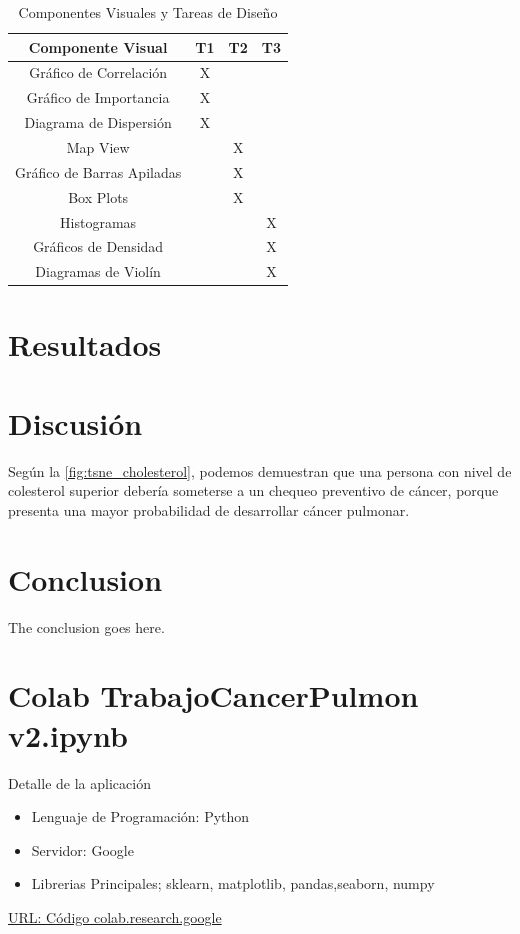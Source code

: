 \documentclass[10pt,journal,compsoc]{IEEEtran}
\begin{document}
\begin{table}[h!]
\centering
\caption{Componentes Visuales y Tareas de Diseño}
\begin{tabular}{|c|c|c|c|}
\hline
\textbf{Componente Visual} & \textbf{T1} & \textbf{T2} & \textbf{T3} \\ \hline
Gráfico de Correlación & X &  &  \\ \hline
Gráfico de Importancia & X &  &  \\ \hline
Diagrama de Dispersión & X &  &  \\ \hline
Map View &  & X &  \\ \hline
Gráfico de Barras Apiladas &  & X &  \\ \hline
Box Plots &  & X &  \\ \hline
Histogramas &  &  & X \\ \hline
Gráficos de Densidad &  &  & X \\ \hline
Diagramas de Violín &  &  & X \\ \hline
\end{tabular}
\label{tab:visualtareas}
\end{table}


\section{Resultados}

\section{Discusión}
Según la \autoref{fig:tsne_cholesterol}, podemos demuestran que una persona con nivel de colesterol superior debería someterse a un chequeo preventivo de cáncer, porque presenta una mayor probabilidad de desarrollar  cáncer pulmonar.

\section{Conclusion}
The conclusion goes here.



\appendices
\section{Colab TrabajoCancerPulmon v2.ipynb}
Detalle de la aplicación
\begin{itemize}
  \item Lenguaje de Programación: Python
  \item Servidor: Google
  \item Librerias Principales; sklearn, matplotlib, pandas,seaborn, numpy
\end{itemize}
\href{https://colab.research.google.com/drive/1-HcDMOWJxGsakeZxqYCUc18EXPyz__4q?usp=sharing}{URL: Código  colab.research.google }
\end{document}
